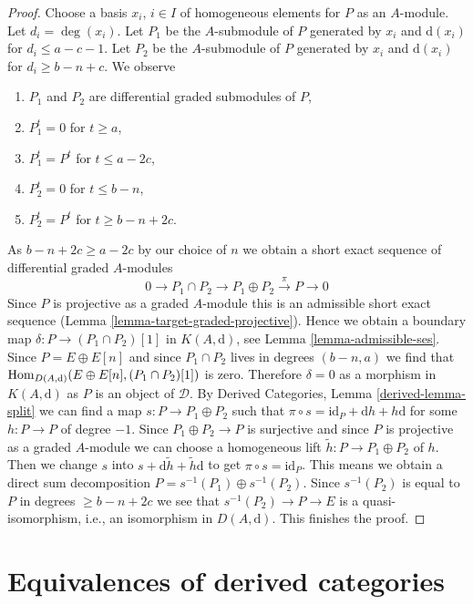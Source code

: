 \begin{proof}
\medskip\noindent
Choose a basis $x_i$, $i \in I$ of homogeneous elements for $P$ as an
$A$-module. Let $d_i = \deg(x_i)$.
Let $P_1$ be the $A$-submodule of $P$ generated by $x_i$ and
$\text{d}(x_i)$ for $d_i \leq a - c - 1$.
Let $P_2$ be the $A$-submodule of $P$ generated by $x_i$ and
$\text{d}(x_i)$ for $d_i \geq b - n + c$.
We observe
\begin{enumerate}
\item $P_1$ and $P_2$ are differential graded submodules of $P$,
\item $P_1^t = 0$ for $t \geq a$,
\item $P_1^t = P^t$ for $t \leq a - 2c$,
\item $P_2^t = 0$ for $t \leq b - n$,
\item $P_2^t = P^t$ for $t \geq b - n + 2c$.
\end{enumerate}
As $b - n + 2c \geq a - 2c$ by our choice of $n$
we obtain a short exact sequence of differential graded $A$-modules
$$
0 \to P_1 \cap P_2 \to P_1 \oplus P_2 \xrightarrow{\pi} P \to 0
$$
Since $P$ is projective as a graded $A$-module this is an admissible
short exact sequence (Lemma \ref{lemma-target-graded-projective}).
Hence we obtain a boundary map
$\delta : P \to (P_1 \cap P_2)[1]$ in $K(A, \text{d})$, see
Lemma \ref{lemma-admissible-ses}.
Since $P = E \oplus E[n]$ and since $P_1 \cap P_2$ lives in
degrees $(b - n, a)$ we find that
$\mathop{\mathrm{Hom}}\nolimits_{D(A, \text{d})}(E \oplus E[n], (P_1 \cap P_2)[1])$ is
zero. Therefore $\delta = 0$ as a morphism in $K(A, \text{d})$
as $P$ is an object of $\mathcal{D}$.
By Derived Categories, Lemma \ref{derived-lemma-split}
we can find a map $s : P \to P_1 \oplus P_2$ such that
$\pi \circ s = \text{id}_P + \text{d}h + h\text{d}$ for some $h : P \to P$
of degree $-1$. Since $P_1 \oplus P_2 \to P$ is surjective and since $P$
is projective as a graded $A$-module we can choose a homogeneous
lift $\tilde h : P \to P_1 \oplus P_2$ of $h$. Then we change
$s$ into $s + \text{d} \tilde h + \tilde h \text{d}$ to get
$\pi \circ s = \text{id}_P$. This means we obtain a direct
sum decomposition $P = s^{-1}(P_1) \oplus s^{-1}(P_2)$.
Since $s^{-1}(P_2)$ is equal to $P$ in degrees $\geq b - n + 2c$
we see that $s^{-1}(P_2) \to P \to E$ is a quasi-isomorphism,
i.e., an isomorphism in $D(A, \text{d})$. This finishes the proof.
\end{proof}








\section{Equivalences of derived categories}
\label{section-equivalence}

